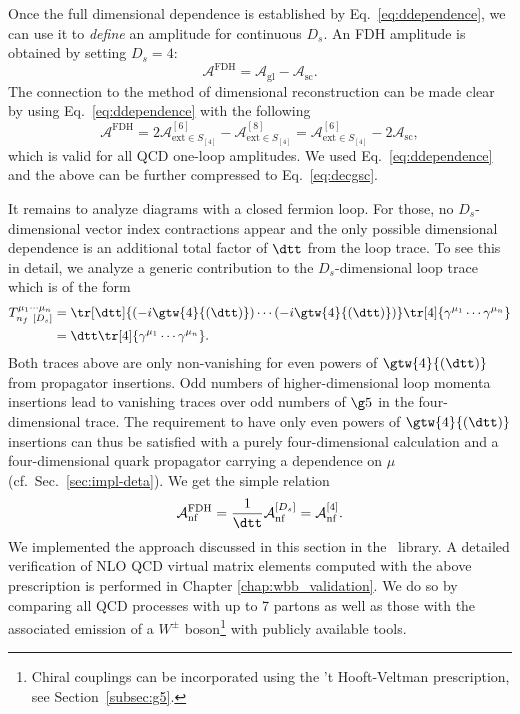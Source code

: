 Once the full dimensional dependence is established by Eq.~\eqref{eq:ddependence}, we can use it to \emph{define}
an amplitude for continuous $D_s$. An FDH amplitude is obtained by setting $D_s=4$:
\begin{equation} \label{eq:decgsc}
  \mathcal{A}^{\text{FDH}} = \mathcal{A}_{\text{gl}} - \mathcal{A}_{\text{sc}}.
\end{equation}
The connection to the method of dimensional reconstruction \cite{Giele:2008ve} can be made clear by using Eq.~\eqref{eq:ddependence} with the following
\begin{equation}
  \mathcal{A}^{\text{FDH}} = 2\mathcal{A}^{[6]}_{\text{ext}\in S_{[4]}} - \mathcal{A}^{[8]}_{\text{ext}\in S_{[4]}} = \mathcal{A}^{[6]}_{\text{ext}\in S_{[4]}} - 2{\mathcal{A}}_{\text{sc}},
\end{equation}
which is valid for all QCD one-loop amplitudes. We used
Eq.~\eqref{eq:ddependence} and the above can be
further compressed to Eq.~\eqref{eq:decgsc}.

It remains to analyze diagrams with a closed fermion loop. For those, no
$D_s$-dimensional vector index contractions appear and the only
possible dimensional dependence is an additional total factor of
$\dtt$ from the loop trace. To see this in detail, we analyze a generic
contribution to the $D_s$-dimensional loop trace which is of the form
\begin{align}
\begin{split}
T^{\mu_1\cdots \mu_n}_{n_f\ [D_s]}  &=
\tr[\dtt]{\left(-i\gtw{4}{(\dtt)}\right)\cdots\left(-i\gtw{4}{(\dtt)}\right)}\tr[4]{\gamma^{\mu_1}\cdots
\gamma^{\mu_n}}\\
&=\dtt \tr[4]{\gamma^{\mu_1}\cdots
\gamma^{\mu_n}}.
\end{split}
\end{align}
Both traces above are only non-vanishing for even
powers of $\gtw{4}{(\dtt)}$ from propagator insertions. Odd numbers of higher-dimensional loop momenta insertions
  lead to vanishing traces over odd numbers of $\g5$ in the
  four-dimensional trace. The requirement to have only even powers of
$\gtw{4}{(\dtt)}$ insertions can thus be satisfied with a purely
four-dimensional calculation and a four-dimensional quark propagator
carrying a dependence on $\mu$ (cf.~Sec.~\ref{sec:impl-deta}). We get the simple relation
\begin{equation} \label{eq:nfdecomp}
  \mathcal{A}^{\text{FDH}}_{\text{nf}} =
  \frac{1}{\dtt}{\mathcal{A}}^{[D_s]}_{\text{nf}} = {\mathcal{A}}^{[4]}_{\text{nf}} .
\end{equation}
We implemented the approach discussed in this section in the
\BlackHat~library. A detailed verification of NLO QCD virtual matrix
elements computed with the above prescription is performed in Chapter
\ref{chap:wbb_validation}. We do so by comparing all QCD
processes with up to 7 partons as well
as those with the associated emission of a $W^{\pm}$
boson\footnote{Chiral couplings can be incorporated using the 't Hooft-Veltman
  prescription, see Section~\ref{subsec:g5}.
} 
with publicly available tools.


